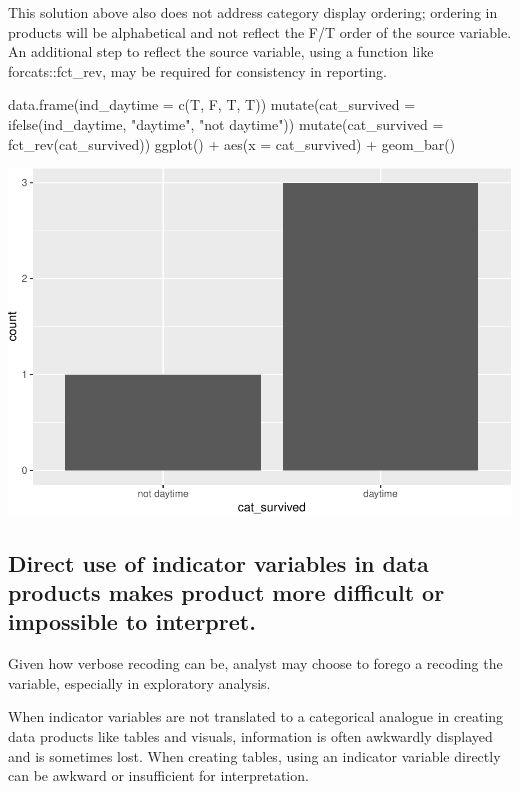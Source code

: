 This solution above also does not address category display ordering;
ordering in products will be alphabetical and not reflect the F/T order
of the source variable. An additional step to reflect the source
variable, using a function like forcats::fct\_rev, may be required for
consistency in reporting.

\begin{Schunk}
\begin{Sinput}
data.frame(ind_daytime = c(T, F, T, T)) %
    mutate(cat_survived = ifelse(ind_daytime, "daytime", "not daytime")) %
  mutate(cat_survived = fct_rev(cat_survived)) %
  ggplot() + 
  aes(x = cat_survived) + 
  geom_bar()
\end{Sinput}

\includegraphics[width=0.69\linewidth]{r_journal_files/figure-latex/unnamed-chunk-5-1} \end{Schunk}

\hypertarget{direct-use-of-indicator-variables-in-data-products-makes-product-more-difficult-or-impossible-to-interpret.}{%
\subsection{Direct use of indicator variables in data products makes
product more difficult or impossible to
interpret.}\label{direct-use-of-indicator-variables-in-data-products-makes-product-more-difficult-or-impossible-to-interpret.}}

Given how verbose recoding can be, analyst may choose to forego a
recoding the variable, especially in exploratory analysis.

When indicator variables are not translated to a categorical analogue in
creating data products like tables and visuals, information is often
awkwardly displayed and is sometimes lost. When creating tables, using
an indicator variable directly can be awkward or insufficient for
interpretation.

